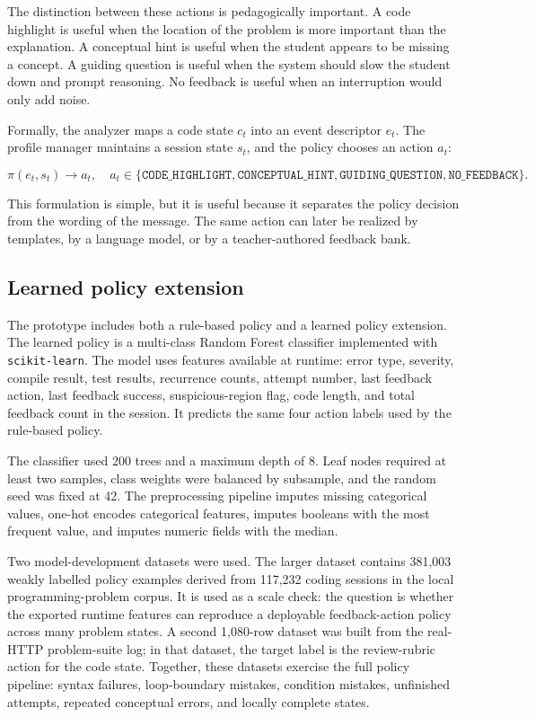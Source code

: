 \documentclass[11pt]{article}
\begin{document}
The distinction between these actions is pedagogically important. A code highlight is useful when the location of the problem is more important than the explanation. A conceptual hint is useful when the student appears to be missing a concept. A guiding question is useful when the system should slow the student down and prompt reasoning. No feedback is useful when an interruption would only add noise.

Formally, the analyzer maps a code state $c_t$ into an event descriptor $e_t$. The profile manager maintains a session state $s_t$, and the policy chooses an action $a_t$:

\[
\pi(e_t, s_t) \rightarrow a_t,\quad a_t \in \{\texttt{CODE\_HIGHLIGHT}, \texttt{CONCEPTUAL\_HINT}, \texttt{GUIDING\_QUESTION}, \texttt{NO\_FEEDBACK}\}.
\]

This formulation is simple, but it is useful because it separates the policy decision from the wording of the message. The same action can later be realized by templates, by a language model, or by a teacher-authored feedback bank.

\subsection{Learned policy extension}

The prototype includes both a rule-based policy and a learned policy extension. The learned policy is a multi-class Random Forest classifier implemented with \texttt{scikit-learn}. The model uses features available at runtime: error type, severity, compile result, test results, recurrence counts, attempt number, last feedback action, last feedback success, suspicious-region flag, code length, and total feedback count in the session. It predicts the same four action labels used by the rule-based policy.

The classifier used 200 trees and a maximum depth of 8. Leaf nodes required at least two samples, class weights were balanced by subsample, and the random seed was fixed at 42. The preprocessing pipeline imputes missing categorical values, one-hot encodes categorical features, imputes booleans with the most frequent value, and imputes numeric fields with the median.

Two model-development datasets were used. The larger dataset contains 381,003 weakly labelled policy examples derived from 117,232 coding sessions in the local programming-problem corpus. It is used as a scale check: the question is whether the exported runtime features can reproduce a deployable feedback-action policy across many problem states. A second 1,080-row dataset was built from the real-HTTP problem-suite log; in that dataset, the target label is the review-rubric action for the code state. Together, these datasets exercise the full policy pipeline: syntax failures, loop-boundary mistakes, condition mistakes, unfinished attempts, repeated conceptual errors, and locally complete states.
\end{document}
